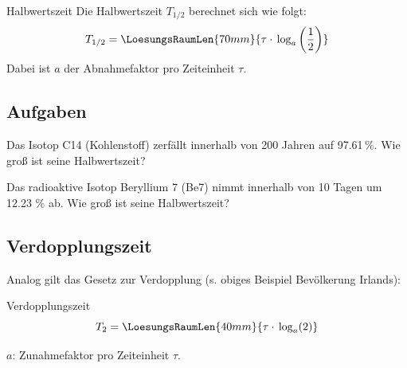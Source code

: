 \begin{gesetz}{Halbwertszeit}{}
  Die Halbwertszeit $T_{1/2}$ berechnet sich wie folgt:
  $$T_{1/2} = \LoesungsRaumLen{70mm}{\tau \cdot{} \log_a\left(\frac12\right)}$$
  Dabei ist $a$ der Abnahmefaktor pro Zeiteinheit $\tau$.
\end{gesetz}


\subsection*{Aufgaben}

Das Isotop C14 (Kohlenstoff) zerfällt innerhalb von 200 Jahren auf
97.61\,\%. Wie groß ist seine Halbwertszeit?



Das radioaktive Isotop Beryllium 7 (Be7) nimmt innerhalb von 10 Tagen um
12.23 \% ab. Wie groß ist seine Halbwertszeit?














\newpage






\subsection{Verdopplungszeit}

Analog gilt das Gesetz zur Verdopplung (s. obiges Beispiel Bevölkerung Irlands):
\begin{gesetz}{Verdopplungszeit}{}
  $$T_2 = \LoesungsRaumLen{40mm}{ \tau \cdot{} \log_a(2)}$$

  $a$: Zunahmefaktor pro Zeiteinheit $\tau$.
\end{gesetz}


